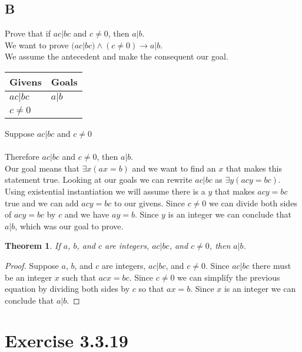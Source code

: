 \documentclass{article}
\newcommand{\n}{ \noindent }
\newtheorem*{theorem}{Theorem}  %
\begin{document}
\subsection*{B}

\n Prove that if $ac|bc$ and $c \neq 0$, then $a|b$. \\

\n We want to prove
$(ac|bc) \land (c \neq 0) \rightarrow a|b$. \\ 

\n We assume the antecedent and make the consequent our goal. \\

\begin{table}[h]
\begin{tabular}{ll}
\hline
Givens & Goals   \\ \hline
$ac|bc$ & $a|b$   \\ 
$c \neq 0$ & \\ \hline
\end{tabular}
\end{table}

\n Suppose $ac|bc$ and $c \neq 0$\\
\indent [proof of $a|b$] \\
\n Therefore $ac|bc$ and $c \neq 0$, then $a|b$. \\

\n Our goal means that $\exists x(ax = b)$ and we want to find an $x$ that makes this statement true. Looking at our goals we can rewrite $ac|bc$ as $\exists y (acy = bc)$. Using existential instantiation we will assume there is a $y$ that makes $acy = bc$ true and we can add $acy = bc$ to our givens. Since $c \neq 0$ we can divide both sides of $acy = bc$ by $c$ and we have $ay = b$. Since $y$ is an integer we can conclude that $a|b$, which was our goal to prove.

\begin{theorem} If $a$, $b$, and $c$ are integers, $ac|bc$, and $c \neq 0$, then $a|b$.
\end{theorem}
\begin{proof}
Suppose $a$, $b$, and $c$ are integers, $ac|bc$, and $c \neq 0$. Since $ac|bc$ there must be an integer $x$ such that $acx = bc$. Since $c \neq 0$ we can simplify the previous equation by dividing both sides by $c$ so that $ax = b$. Since $x$ is an integer we can conclude that $a|b$.
\end{proof}

\section*{Exercise 3.3.19}
\end{document}
